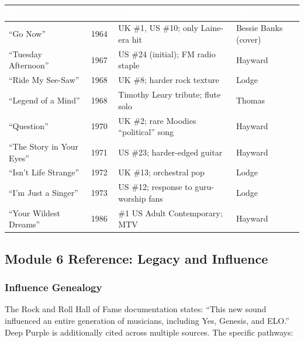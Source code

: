 \documentclass[11pt,letterpaper]{article}
\newcommand{\tableheader}[1]{\textbf{\sffamily\textcolor{white}{#1}}}
\begin{document}
\begin{center}
\begin{tabularx}{\textwidth}{L{4cm}C{1.5cm}XL{2.5cm}}
\toprule
{}
\tableheader{Song} & \tableheader{Year} & \tableheader{Significance} & \tableheader{Writer} \\
\midrule
``Go Now'' & 1964 & UK \#1, US \#10; only Laine-era hit & Bessie Banks (cover) \\
``Tuesday Afternoon'' & 1967 & US \#24 (initial); FM radio staple & Hayward \\
``Ride My See-Saw'' & 1968 & UK \#8; harder rock texture & Lodge \\
``Legend of a Mind'' & 1968 & Timothy Leary tribute; flute solo & Thomas \\
``Question'' & 1970 & UK \#2; rare Moodies ``political'' song & Hayward \\
``The Story in Your Eyes'' & 1971 & US \#23; harder-edged guitar & Hayward \\
``Isn't Life Strange'' & 1972 & UK \#13; orchestral pop & Lodge \\
``I'm Just a Singer'' & 1973 & US \#12; response to guru-worship fans & Lodge \\
``Your Wildest Dreams'' & 1986 & \#1 US Adult Contemporary; MTV & Hayward \\
\bottomrule
\end{tabularx}
\end{center}

\subsection{Module 6 Reference: Legacy and Influence}

\subsubsection{Influence Genealogy}

The Rock and Roll Hall of Fame documentation states: ``This new sound influenced an entire generation of musicians, including Yes, Genesis, and ELO.'' Deep Purple is additionally cited across multiple sources. The specific pathways:
\end{document}
